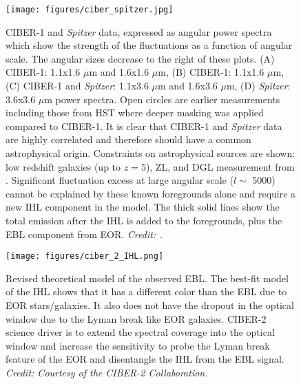 \begin{figure}[H]
	\centering
	\texttt{[image: figures/ciber\_spitzer.jpg]} 
	\caption[CIBER-1 and \textit{Spitzer} cross-correlated power spectra.]{CIBER-1 and \textit{Spitzer} data, expressed as angular power spectra which show the strength of the fluctuations as a function of angular scale. The angular sizes decrease to the right of these plots. (A) CIBER-1: 1.1x1.6 $\mu$m and 1.6x1.6 $\mu$m, (B) CIBER-1: 1.1x1.6 $\mu$m, (C) CIBER-1 and \textit{Spitzer}: 1.1x3.6 $\mu$m and 1.6x3.6 $\mu$m, (D) \textit{Spitzer}: 3.6x3.6 $\mu$m power spectra. Open circles are earlier measurements including those from HST where deeper masking was applied compared to CIBER-1. It is clear that CIBER-1 and \textit{Spitzer} data are highly correlated and therefore should have a common astrophysical origin. Constraints on astrophysical sources are shown: low redshift galaxies (up to $z = 5$), ZL, and DGL measurement from \citet{Arai2015}. Significant fluctuation excess at large angular scale ($l \sim$ 5000) cannot be explained by these known foregrounds alone and require a new IHL component in the model. The thick solid lines show the total emission after the IHL is added to the foregrounds, plus the EBL component from EOR. \textit{Credit: \citet{ZemcovScience}.}\label{fig:CIBER_cross-correlation}}
\end{figure}


\begin{figure}[H]
	\centering
	\texttt{[image: figures/ciber\_2\_IHL.png]} 
	\caption[Revised theoretical model of the observed EBL to include IHL.]{\label{fig:ciber2_motivation}Revised theoretical model of the observed EBL. The best-fit model of the IHL shows that it has a different color than the EBL due to EOR stars/galaxies. It also does not have the dropout in the optical window due to the Lyman break like EOR galaxies. CIBER-2 science driver is to extend the spectral coverage into the optical window and increase the sensitivity to probe the Lyman break feature of the EOR and disentangle the IHL from the EBL signal. \textit{Credit: Courtesy of the CIBER-2 Collaboration.}}
\end{figure}


